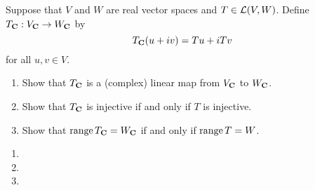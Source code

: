 \begin{solution}
    \\ \td \\
\end{solution}

\begin{exercise}
    Suppose that $V$ and $W$ are real vector spaces and $T \in \mathcal{L}(V,W)$. Define $T_{\mathbf{C}} : V_{\mathbf{C}} \to W_{\mathbf{C}}$ by
    $$T_{\mathbf{C}}(u + iv) = Tu + iTv$$
    for all $u,v \in V$.
    \begin{enumerate}[label=(\alph*)]
        \item Show that $T_{\mathbf{C}}$ is a (complex) linear map from $V_{\mathbf{C}}$ to $W_{\mathbf{C}}$.
        \item Show that $T_{\mathbf{C}}$ is injective if and only if $T$ is injective.
        \item Show that $\operatorname{\text{range}} T_{\mathbf{C}} = W_{\mathbf{C}}$ if and only if $\operatorname{\text{range}} T = W$.\\
    \end{enumerate}
\end{exercise}

\begin{solution}
    \begin{enumerate}[label=(\alph*)]
        \item \td 
        \item \td 
        \item \td 
    \end{enumerate}
\end{solution}

